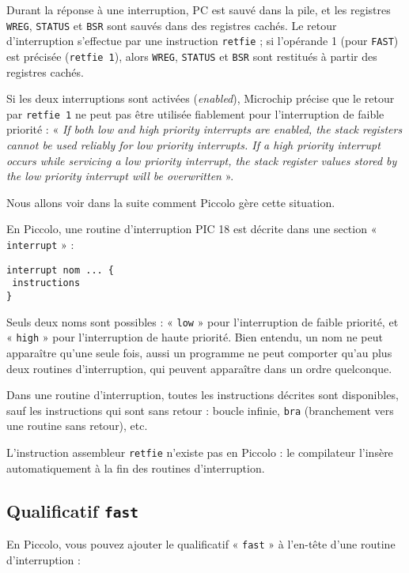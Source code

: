 Durant la réponse à une interruption, PC est sauvé dans la pile, et les registres \texttt{WREG}, \texttt{STATUS} et \texttt{BSR} sont sauvés dans des registres cachés. Le retour d’interruption s’effectue par une instruction \texttt{retfie} ; si l’opérande 1 (pour \texttt{FAST}) est précisée (\texttt{retfie 1}), alors \texttt{WREG}, \texttt{STATUS} et \texttt{BSR} sont restitués à partir des registres cachés.

Si les deux interruptions sont activées (\emph{enabled}), Microchip précise que le retour par \texttt{retfie 1} ne peut pas être utilisée fiablement pour l’interruption de faible priorité : « \emph{If both low and high priority interrupts are enabled, the stack registers cannot be used reliably for low priority interrupts. If a high priority interrupt occurs while servicing a low priority interrupt, the stack register values stored by the low priority interrupt will be overwritten} ».

Nous allons voir dans la suite comment Piccolo gère cette situation.

En Piccolo, une routine d’interruption PIC 18 est décrite dans une section « \texttt{interrupt} » :

\begin{lstlisting}[language=piccolo]
interrupt nom ... {
 instructions
}
\end{lstlisting}

Seuls deux noms sont possibles : « \texttt{low} » pour l’interruption de faible priorité, et « \texttt{high} » pour l’interruption de haute priorité. Bien entendu, un nom ne peut apparaître qu’une seule fois, aussi un programme ne peut comporter qu'au plus deux routines d'interruption, qui peuvent apparaître dans un ordre quelconque.

Dans une routine d'interruption, toutes les instructions décrites sont disponibles, sauf les instructions qui sont sans retour : boucle infinie, \texttt{bra} (branchement vers une routine sans retour), etc.

L’instruction assembleur \texttt{retfie} n’existe pas en Piccolo : le compilateur l’insère automatiquement à la fin des routines d’interruption.



\subsection{Qualificatif \texttt{fast}}

En Piccolo, vous pouvez ajouter le qualificatif « \texttt{fast} » à l’en-tête d’une routine d’interruption :

